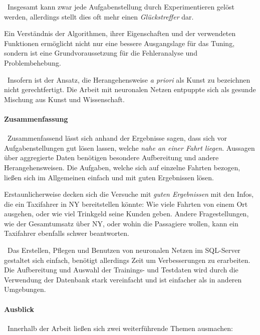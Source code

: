 ~\newline Insgesamt kann zwar jede Aufgabenstellung durch Experimentieren gelöst werden, allerdings stellt dies oft mehr einen \textit{Glückstreffer} dar. 

Ein Verständnis der Algorithmen, ihrer Eigenschaften und der verwendeten Funktionen ermöglicht nicht nur eine bessere Ausgangslage für das Tuning, sondern ist eine Grundvoraussetzung für die Fehleranalyse und Problembehebung. 

~\newline Insofern ist der Ansatz, die Herangehensweise \textit{a priori} als Kunst zu bezeichnen nicht gerechtfertigt. Die Arbeit mit neuronalen Netzen entpuppte sich als gesunde Mischung aus Kunst und Wissenschaft. 

\paragraph{Zusammenfassung} ~\newline Zusammenfassend lässt sich anhand der Ergebnisse sagen, dass sich vor Aufgabenstellungen gut lösen lassen, welche \textit{nahe an einer Fahrt liegen}. Aussagen über aggregierte Daten benötigen besondere Aufbereitung und andere Herangehensweisen. Die Aufgaben, welche sich auf einzelne Fahrten bezogen, ließen sich im Allgemeinen einfach und mit guten Ergebnissen lösen.

Erstaunlicherweise decken sich die Versuche mit \textit{guten Ergebnissen} mit den Infos, die ein Taxifahrer in NY bereitstellen könnte: Wie viele Fahrten von einem Ort ausgehen, oder wie viel Trinkgeld seine Kunden geben. Andere Fragestellungen, wie der Gesamtumsatz über NY, oder wohin die Passagiere wollen, kann ein Taxifahrer ebenfalls schwer beantworten. 

~\newline Das Erstellen, Pflegen und Benutzen von neuronalen Netzen im SQL-Server gestaltet sich einfach, benötigt allerdings Zeit um Verbesserungen zu erarbeiten. Die Aufbereitung und Auswahl der Trainings- und Testdaten wird durch die Verwendung der Datenbank stark vereinfacht und ist einfacher als in anderen Umgebungen.

\paragraph{Ausblick}~\newline Innerhalb der Arbeit ließen sich zwei weiterführende Themen ausmachen: 

